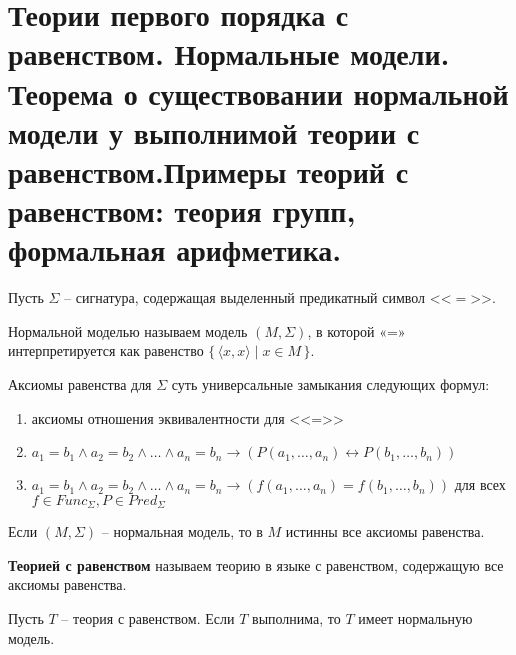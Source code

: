 \section{Теории первого порядка с равенством. Нормальные модели. Теорема о существовании нормальной модели у
выполнимой теории с равенством.Примеры теорий с равенством: теория групп, формальная арифметика.}
Пусть $\Sigma$ -- сигнатура, содержащая выделенный предикатный символ <<$ = $>>.
\begin{definition}
	Нормальной моделью называем модель $(M,\Sigma)$, в которой «=» интерпретируется как равенство $\{\,\langle x,x
	\rangle\mid x\in M \,\}$.
\end{definition}
\begin{definition}
	Аксиомы равенства для $\Sigma$ суть универсальные замыкания следующих формул:
	\begin{enumerate}
		\item аксиомы отношения эквивалентности для <<=>>
		\item $a_{1}=b_{1} \wedge a_{2}=b_{2} \wedge \ldots \wedge a_{n}=b_{n} \rightarrow\left(P\left(a_{1}, \ldots,
	a_{n}\right) \leftrightarrow P\left(b_{1}, \ldots, b_{n}\right)\right)$
		\item $a_{1}=b_{1} \wedge a_{2}=b_{2} \wedge \ldots \wedge a_{n}=b_{n} \rightarrow\left(f\left(a_{1}, \ldots,
	a_{n}\right)=f\left(b_{1}, \ldots, b_{n}\right)\right)$ для всех $f\in Func_\Sigma,P\in Pred_\Sigma$
	\end{enumerate}
\end{definition}
\begin{proposition}
	Если $(M,\Sigma)$ -- нормальная модель, то в $M$ истинны все аксиомы равенства.
\end{proposition}
\begin{definition}
	\textbf{Теорией с равенством} называем теорию в языке с равенством, содержащую все аксиомы равенства.
\end{definition}
\begin{theorem}
	Пусть $T$ -- теория с равенством. Если $T$ выполнима, то $T$ имеет нормальную модель.
\end{theorem}
